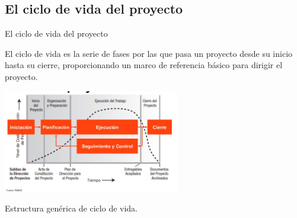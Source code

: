\subsection{El ciclo de vida del proyecto}
\begin{frame}{El ciclo de vida del proyecto}
	
	El ciclo de vida es la serie de fases por las que pasa un proyecto desde su inicio hasta su cierre, proporcionando un marco de referencia básico para dirigir el proyecto.

	\begin{center}
		\includegraphics[height=4.5cm]{figuras/ciclo_vida_00.png}

		Estructura genérica de ciclo de vida.
	\end{center}


	

\end{frame}

